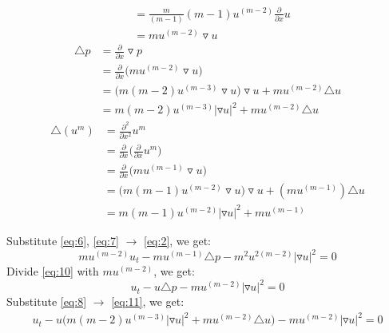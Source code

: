 \documentclass[a4paper,9pt]{article}
\begin{document}
\begin{enumerate}
\begin{multicols}{2}
\begin{equation}
\begin{aligned}
		&= \frac{m}{(m-1)} (m-1) u^{(m-2)} \frac{\partial}{\partial x}u\\
		&= m u^{(m-2)} \triangledown u
		\end{aligned}
		\end{equation}
		\columnbreak
		\begin{equation}\label{eq:8}
		\begin{aligned}
		\triangle p &= \frac{\partial}{\partial x} \triangledown p\\
		&= \frac{\partial}{\partial x} \big(mu^{(m-2)} \triangledown u\big)\\
		&=\big(m(m-2)u^{(m-3)}\triangledown u\big)\triangledown u + mu^{(m-2)} \triangle u\\
		&= m(m-2)u^{(m-3)} |\triangledown u|^2 + mu^{(m-2)} \triangle u
		\end{aligned}
		\end{equation}
		\newline
		\begin{equation}\label{eq:9}
		\begin{aligned}
		\triangle (u^m) &= \frac{\partial^2}{\partial x^2} u^m\\
		&= \frac{\partial}{\partial x} \bigg(\frac{\partial}{\partial x}u^m\bigg)\\
		&= \frac{\partial}{\partial x} \bigg(mu^{(m-1)}\triangledown u\bigg)\\
		&= \big(m(m-1)u^{(m-2)}\triangledown u\big)\triangledown u + (mu^{(m-1)}) \triangle u\\
		&= m(m-1)u^{(m-2)}|\triangledown u|^2 + mu^{(m-1)}
		\end{aligned}
		\end{equation}
	\end{multicols}
	Substitute \eqref{eq:6}, \eqref{eq:7} $\rightarrow$ \eqref{eq:2}, we get:
	\begin{equation}\label{eq:10}
	m u^{(m-2)} u_t - mu^{(m-1)} \triangle p - m^2u^{2(m-2)} |\triangledown u|^2 = 0
	\end{equation}
	Divide \eqref{eq:10} with $mu^{(m-2)}$, we get:
	\begin{equation}\label{eq:11}
	u_t - u \triangle p - m u^{(m-2)} |\triangledown u|^2 = 0
	\end{equation}
	Substitute \eqref{eq:8} $\rightarrow$ \eqref{eq:11}, we get:
	\begin{equation}\label{eq:12}
	\begin{aligned}
	u_t - u \bigg( m(m-2)u^{(m-3)} |\triangledown u|^2 + mu^{(m-2)} \triangle u \bigg) - m u^{(m-2)} |\triangledown u|^2 = 0\\

\end{aligned}
\end{equation}
\end{enumerate}
\end{document}
